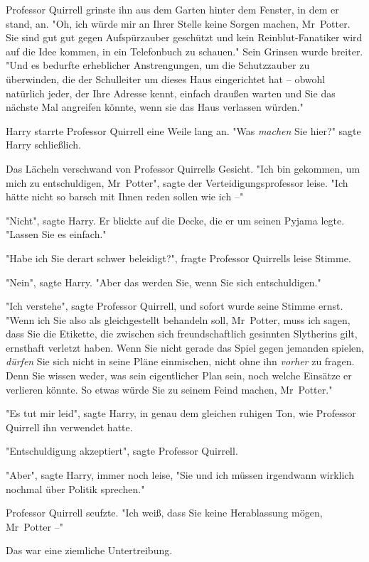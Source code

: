 {Professor Quirrell grinste ihn aus dem Garten hinter dem Fenster, in dem er stand, an. "Oh, ich würde mir an Ihrer Stelle keine Sorgen machen, Mr~Potter. Sie sind gut gut gegen Aufspürzauber geschützt und kein Reinblut-Fanatiker wird auf die Idee kommen, in ein Telefonbuch zu schauen." Sein Grinsen wurde breiter. "Und es bedurfte erheblicher Anstrengungen, um die Schutzzauber zu überwinden, die der Schulleiter um dieses Haus eingerichtet hat -- obwohl natürlich jeder, der Ihre Adresse kennt, einfach draußen warten und Sie das nächste Mal angreifen könnte, wenn sie das Haus verlassen würden."

Harry starrte Professor Quirrell eine Weile lang an. "Was \emph{machen} Sie hier?" sagte Harry schließlich.

Das Lächeln verschwand von Professor Quirrells Gesicht. "Ich bin gekommen, um mich zu entschuldigen, Mr~Potter", sagte der Verteidigungsprofessor leise. "Ich hätte nicht so barsch mit Ihnen reden sollen wie ich --"

"Nicht", sagte Harry. Er blickte auf die Decke, die er um seinen Pyjama legte. "Lassen Sie es einfach."

"Habe ich Sie derart schwer beleidigt?", fragte Professor Quirrells leise Stimme.

"Nein", sagte Harry. "Aber das werden Sie, wenn Sie sich entschuldigen."

"Ich verstehe", sagte Professor Quirrell, und sofort wurde seine Stimme ernst. "Wenn ich Sie also als gleichgestellt behandeln soll, Mr~Potter, muss ich sagen, dass Sie die Etikette, die zwischen sich freundschaftlich gesinnten Slytherins gilt, ernsthaft verletzt haben. Wenn Sie nicht gerade das Spiel gegen jemanden spielen, \emph{dürfen} Sie sich nicht in seine Pläne einmischen, nicht ohne ihn \emph{vorher} zu fragen. Denn Sie wissen weder, was sein eigentlicher Plan sein, noch welche Einsätze er verlieren könnte. So etwas würde Sie zu seinem Feind machen, Mr~Potter."

"Es tut mir leid", sagte Harry, in genau dem gleichen ruhigen Ton, wie Professor Quirrell ihn verwendet hatte.

"Entschuldigung akzeptiert", sagte Professor Quirrell.

"Aber", sagte Harry, immer noch leise, "Sie und ich müssen irgendwann wirklich nochmal über Politik sprechen."

Professor Quirrell seufzte. "Ich weiß, dass Sie keine Herablassung mögen, Mr~Potter --"

Das war eine ziemliche Untertreibung.

}
